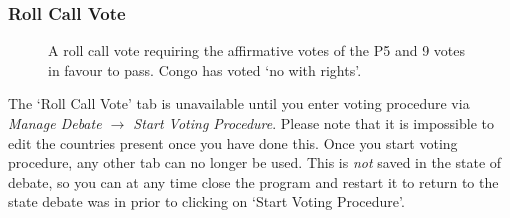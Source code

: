 \documentclass[11pt, a4paper]{article}
\begin{document}
\subsubsection{Roll Call Vote}
\begin{figure}[tbp]
\centering
{}
\caption{A roll call vote requiring the affirmative votes of the P5 and 9 votes in favour to pass. Congo has voted `no with rights'.}
\label{fig:sub} %
\end{figure}

The `Roll Call Vote' tab is unavailable until you enter voting procedure via \emph{Manage Debate $\rightarrow$ Start Voting Procedure}. Please note that it is impossible to edit the countries present once you have done this. Once you start voting procedure, any other tab can no longer be used. This is \emph{not} saved in the state of debate, so you can at any time close the program and restart it to return to the state debate was in prior to clicking on `Start Voting Procedure'.
\end{document}
